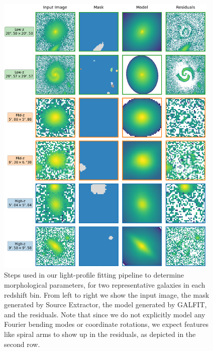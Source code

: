 \begin{figure}
    \centering
    \includegraphics[width = 0.95\textwidth]{galfit_example_fits.png}
    \caption{
     Steps used in our light-profile fitting pipeline to determine morphological parameters, for two representative galaxies in each redshift bin. From left to right we show the input image, the  mask generated by Source Extractor, the model generated by GALFIT, and the residuals. Note that since we do not explicitly model any Fourier bending modes or coordinate rotations, we expect features like spiral arms to show up in the residuals, as depicted in the second row.
    }
    \label{fig_c3:galfit_example_fits}
\end{figure}


